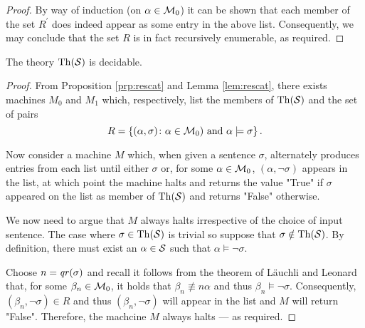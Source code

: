 \begin{proof}
	By way of induction (on $\alpha\in\mathcal{M}_0$) it can be shown that each member of the set $R^\prime$ does indeed appear as some entry in the above list.  Consequently, we may conclude that the set $R$ is in fact recursively enumerable, as required.
\end{proof}

\begin{thm}
	The theory $\operatorname{Th}(\mathcal{S})$ is decidable.
\end{thm}
\begin{proof}
	From Proposition \ref{prp:rescat} and Lemma \ref{lem:rescat}, there exists machines $M_0$ and $M_1$ which, respectively, list the members of $\operatorname{Th}(\mathcal{S})$ and the set of pairs
	\begin{equation}
		R=\left\lbrace (\alpha,\sigma)\colon \alpha\in\mathcal{M}_0)\text{ and }\alpha\models\sigma \right\rbrace.
	\end{equation}

	Now consider a machine $M$ which, when given a sentence $\sigma$, alternately produces entries from each list until either $\sigma$ or, for some $\alpha\in\mathcal{M}_0$, $(\alpha,\neg\sigma)$ appears in the list, at which point the machine halts and returns the value "True" if $\sigma$ appeared on the list as member of $\operatorname{Th}(\mathcal{S})$ and returns "False" otherwise.

	We now need to argue that $M$ always halts irrespective of the choice of input sentence.  The case where $\sigma\in\operatorname{Th}(\mathcal{S})$ is trivial so suppose that $\sigma\notin\operatorname{Th}(\mathcal{S})$.  By definition, there must exist an $\alpha\in\mathcal{S}$ such that $\alpha\models\neg\sigma$.

	Choose $n=\mathit{qr}(\sigma)$ and recall it follows from the theorem of L\"auchli and Leonard that, for some $\beta_n\in\mathcal{M}_0$, it holds that $\beta_n\nequiv{n}\alpha$ and thus $\beta_n\models\neg\sigma$.  Consequently, $(\beta_n,\neg\sigma)\in R$ and thus $(\beta_n,\neg\sigma)$ will appear in the list and $M$ will return "False".  Therefore, the machcine $M$ always halts --- as required.
\end{proof}
